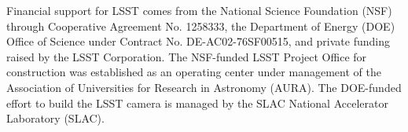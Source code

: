 \documentclass[]{spie}  %
\begin{document}
\acknowledgments %

Financial support for LSST comes from the National Science Foundation (NSF) through Cooperative Agreement No. 1258333, the Department of Energy (DOE) Office of Science under Contract No. DE-AC02-76SF00515, and private funding raised by the LSST Corporation. The NSF-funded LSST Project Office for construction was established as an operating center under management of the Association of Universities for Research in Astronomy (AURA).  The DOE-funded effort to build the LSST camera is managed by the SLAC National Accelerator Laboratory (SLAC).    

\end{document}
